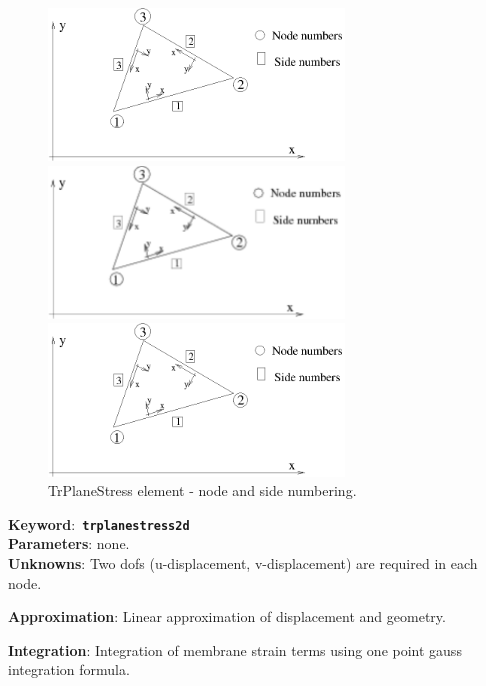 \documentclass[a4paper]{article}
\newcommand{\descitem}[1]{{\noindent \bf #1}:}
\newcommand{\elemkeyword}[1]{\descitem{Keyword}~{\bf \texttt{#1}}}
\begin{document}
\begin{figure}[htb]
\begin{htmlonly}
  \centerline{\includegraphics[width=0.7\textwidth]{trplanstrss.eps}}
\end{htmlonly}
\ifpdf
\centerline{\includegraphics[width=0.7\textwidth]{trplanstrss.pdf}}
\else
\centerline{\includegraphics[width=0.7\textwidth]{trplanstrss.eps}}
\fi
\caption{TrPlaneStress element - node and side numbering.}
\label{TrPlanestressfig}
\end{figure}

\elemkeyword{trplanestress2d}\\
\descitem{Parameters} none.\\
\descitem{Unknowns}
Two dofs (u-displacement, v-displacement) are required in each node.

\descitem{Approximation} Linear approximation of displacement and
geometry.

\descitem{Integration}
Integration of membrane strain terms using one point gauss integration formula.
\end{document}
